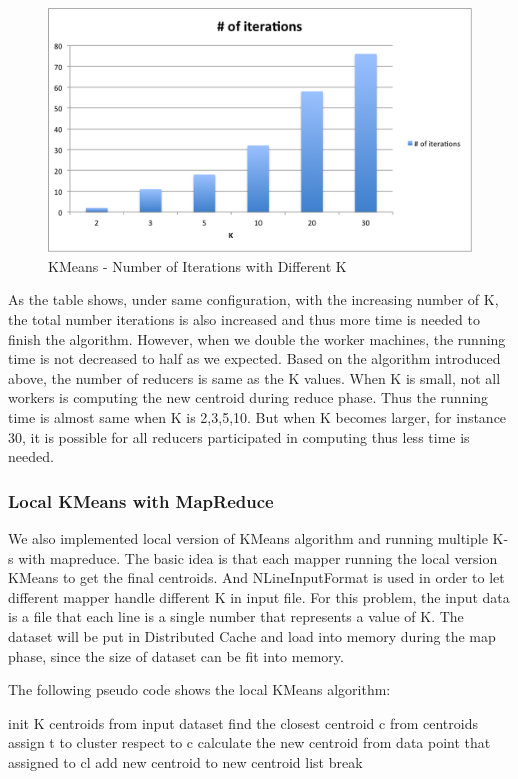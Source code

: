 \documentclass[11pt]{article} %
\begin{document}
\begin{figure}[htbp]
\begin{center}
\includegraphics[scale=0.7]{kmeans-iter.png}
\caption{KMeans - Number of Iterations with Different K}
\label{fig:kmeans-iter}
\end{center}
\end{figure}


As the table shows, under same configuration, with the increasing number of K, the total number iterations is also increased and thus more time is needed to finish the algorithm. However, when we double the worker machines, the running time is not decreased to half as we expected. Based on the algorithm introduced above, the number of reducers is same as the K values. When K is small, not all workers is computing the new centroid during reduce phase. Thus the running time is almost same when K is 2,3,5,10. But when K becomes larger, for instance 30, it is possible for all reducers participated in computing thus less time is needed.

\subsubsection{Local KMeans with MapReduce}
We also implemented local version of KMeans algorithm and running multiple K-s with mapreduce. The basic idea is that each mapper running the local version KMeans to get the final centroids. And NLineInputFormat is used in order to let different mapper handle different K in input file. For this problem, the input data is a file that each line is a single number that represents a value of K. The dataset will be put in Distributed Cache and load into memory during the map phase, since the size of dataset can be fit into memory.

The following pseudo code shows the local KMeans algorithm:
\begin{algorithmic}[1]
\State init K centroids from input dataset
	\State find the closest centroid c from centroids
	\State assign t to cluster respect to c
\EndFor
{}
	\State calculate the new centroid from data point that assigned to cl
	\State add new centroid to new centroid list
\EndFor
{}
	\State break
\EndIf
\EndWhile
\EndFunction
\end{algorithmic}
\end{document}
